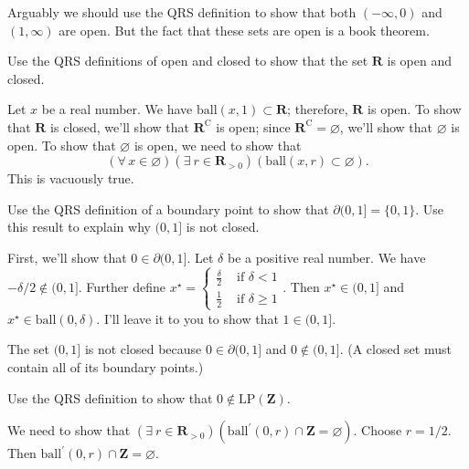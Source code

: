 \documentclass[12pt,fleqn,answers]{exam}
\newcommand{\reals}{\mathbf{R}}
\newcommand{\ball}{\mathrm{ball}}
\newcommand{\integers}{\mathbf{Z}}
\newcommand{\LP}{\mathrm{LP}}
\let\oldforall\forall
\renewcommand{\forall}{\oldforall \, }
\let\oldexist\exists
\renewcommand{\exists}{\oldexist \: }
\begin{document}
\begin{questions}
\begin{solution}
\quad Arguably we should use the QRS definition to show that both  $(-\infty,0)$  and $(1,\infty)$ are open. But the fact that these sets are
open is a book theorem.

\end{solution}

\question   Use the QRS definitions of open and closed to show that the set \(\reals\) is open and closed.

\begin{solution}
Let \(x\) be a real number.  We have \(\ball(x,1) \subset \reals\); therefore, \(\reals\) is open.  To show that \(\reals\) is
closed, we'll show that \(\reals^{\mathrm{C}} \) is open; since  \(\reals^{\mathrm{C}} = \varnothing\), we'll show that 
\(\varnothing\) is open. To show that \(\varnothing\) is open, we need to show that
\begin{equation*}
  \left(\forall x \in \varnothing \right)
  \left(\exists r \in \reals_{>0} \right)
  \left(\ball(x,r) \subset \varnothing \right).
\end{equation*}
This is vacuously true.
 \end{solution}
 
\question   Use the QRS definition of a boundary point to show that \(\partial(0,1] = \{0,1\}\).  Use this
result to explain why \((0,1]\) is not closed.
\begin{solution}
 First, we'll show that \( 0 \in \partial(0,1]
\). Let \(\delta\) be a positive real number.  We have \(-\delta/2
\notin (0,1]\). Further define
\( x^\star = \displaystyle \begin{cases} \frac{\delta}{2} & \mbox{ if } \delta <
  1 \\ \frac{1}{2} & \mbox { if } \delta \geq 1 
   \end{cases} \).  Then \(x^\star \in (0,1]\) and \(x^\star \in
   \ball(0,\delta)\). I'll leave it to you to show that  \(1 \in (0,1]\). 


\quad The set  \((0,1]\) is not closed because \(0 \in
 \partial(0,1]\) and \(0 \notin (0,1] \). (A closed set
must contain all of its boundary points.)
\end{solution}

\question  Use the QRS definition to show that \(0 \not \in  \LP(\integers)\).

\begin{solution}
  We need to show that $(\exists r \in \reals_{>0})
                (\ball^\prime(0,r) \cap \integers = \varnothing)$.
Choose $r=1/2$. Then $\ball^\prime(0,r) \cap \integers
=  \varnothing$.
\end{solution}


\end{questions}
\end{document}
